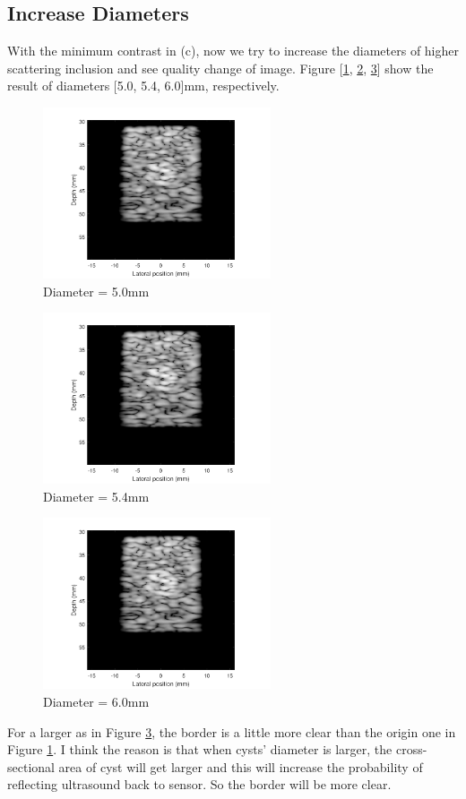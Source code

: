 \documentclass{article}
\begin{document}
\subsection{Increase Diameters}
With the minimum contrast in (c), now we try to increase the diameters of higher scattering inclusion and see quality change of image.
Figure [\ref{fig:radius-25}, \ref{fig:radius-27}, \ref{fig:radius-30}] show the result of diameters [5.0, 5.4, 6.0]mm, respectively.
\begin{figure}[H]
	\centering
	\includegraphics[width = 0.6\textwidth]{src/radius_25.pdf}
	\caption{Diameter = 5.0mm}
	\label{fig:radius-25}
\end{figure}
\begin{figure}[H]
	\centering
	\includegraphics[width = 0.6\textwidth]{src/radius_27.pdf}
	\caption{Diameter = 5.4mm}
	\label{fig:radius-27}
\end{figure}
\begin{figure}[H]
	\centering
	\includegraphics[width = 0.6\textwidth]{src/radius_30.pdf}
	\caption{Diameter = 6.0mm}
	\label{fig:radius-30}
\end{figure}
For a larger as in Figure \ref{fig:radius-30}, the border is a little more clear than the origin one in Figure \ref{fig:radius-25}. I think the 
reason is that when cysts' diameter is larger, the cross-sectional area of cyst will get larger and this will increase the probability of 
reflecting ultrasound back to sensor. So the border will be more clear.
\end{document}
